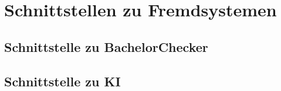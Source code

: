 \chapter{Schnittstellen zu Fremdsystemen}\label{ch:schnittstellen}


\section{Schnittstelle zu BachelorChecker}\label{sec:schnittstelle-bachelorchecker}


\section{Schnittstelle zu KI}\label{sec:schnittstelle-ki}
